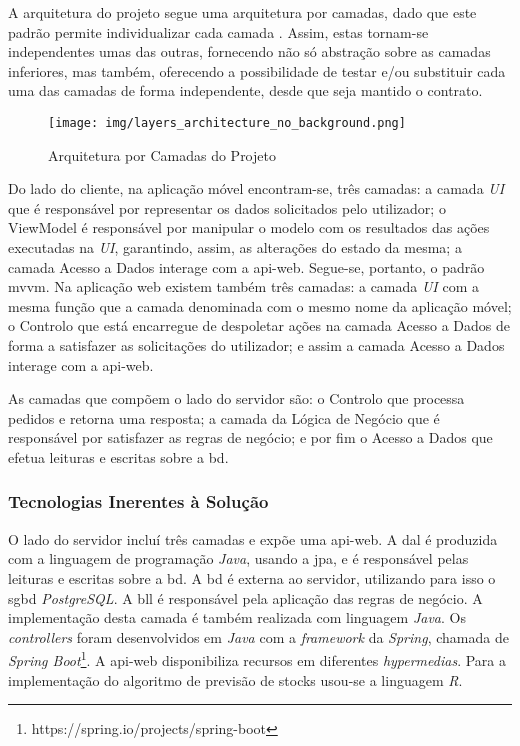 A arquitetura do projeto segue uma arquitetura por camadas, dado que este padrão permite individualizar cada camada \cite{Haque:2007:ADA:1698307.1698331}. Assim, estas tornam-se independentes umas das outras, fornecendo não só abstração sobre as camadas inferiores, mas também, oferecendo a possibilidade de testar e/ou substituir cada uma das camadas de forma independente, desde que seja mantido o contrato.

\begin{figure}[H]
	\centering
	\texttt{[image: img/layers\_architecture\_no\_background.png]}
	\caption{Arquitetura por Camadas do Projeto}
	\label{project-layers-structure}
\end{figure}

Do lado do cliente, na aplicação móvel encontram-se, três camadas: a camada \textit{UI} que é responsável por representar os dados solicitados pelo utilizador; o ViewModel é responsável por manipular o modelo com os resultados das ações executadas na \textit{UI}, garantindo, assim, as alterações do estado da mesma; a camada Acesso a Dados interage com a \gls{api-web}. Segue-se, portanto, o padrão \acrfull{mvvm}.
Na aplicação web existem também três camadas: a camada \textit{UI} com a mesma função que a camada denominada com o mesmo nome da aplicação móvel; o Controlo que está encarregue de despoletar ações na camada Acesso a Dados de forma a satisfazer as solicitações do utilizador; e assim a camada Acesso a Dados interage com a \gls{api-web}. 

As camadas que compõem o lado do servidor são: o Controlo que processa pedidos e retorna uma resposta; a camada da Lógica de Negócio que é responsável por satisfazer as regras de negócio; e por fim o Acesso a Dados que efetua leituras e escritas sobre a \acrshort{bd}.

\subsubsection{Tecnologias Inerentes à Solução}\label{subsec233}

O lado do servidor incluí três camadas e expõe uma \gls{api-web}. A \acrfull{dal} é produzida com a linguagem de programação \textit{Java}, usando a \acrfull{jpa}, e é responsável pelas leituras e escritas sobre a \acrfull{bd}. A \acrshort{bd} é externa ao servidor, utilizando para isso o \acrfull{sgbd} \textit{PostgreSQL}. A \acrfull{bll} é responsável pela aplicação das regras de negócio. A implementação desta camada é também realizada com linguagem \textit{Java}. Os \textit{controllers} foram desenvolvidos em \textit{Java} com a \textit{framework} da \textit{Spring}, chamada de \textit{Spring Boot}\footnote{https://spring.io/projects/spring-boot}. A \gls{api-web} disponibiliza recursos em diferentes \textit{hypermedias}. Para a implementação do algoritmo de previsão de stocks usou-se a linguagem \textit{R}.

